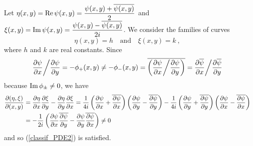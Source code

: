 Let $\displaystyle
\eta(x,y) = \operatorname{Re} \psi(x,y) = \frac{ \psi(x,y)+ \overline{\psi(x,y)}}{2}$
and
$\displaystyle \xi(x,y) = \operatorname{Im} \psi(x,y)
= \frac{ \psi(x,y) -\overline{\psi(x,y)}}{2i}$.
We consider the families of curves
\[
\eta(x,y) = h \quad \text{and} \quad \xi(x,y) = k \ ,
\]
where $h$ and $k$ are real constants.  Since
\[
\frac{\partial{\psi}}{\partial x} \bigg/ \frac{\partial{\psi}}{\partial y} = -\phi_{+}(x,y) \neq -\phi_{-}(x,y)
= \overline{ \left(\frac{\partial{\psi}}{\partial x} \bigg/ \frac{\partial{\psi}}{\partial y}\right)}
= \frac{\partial{\overline{\psi}}}{\partial x} \bigg/ \frac{\partial{\overline{\psi}}}{\partial y}
\]
because $\operatorname{Im} \phi_{\pm} \neq 0$, we have
\begin{align*}
\frac{\partial(\eta,\xi)}{\partial(x,y)}
&= \frac{\partial{\eta}}{\partial x}\frac{\partial{\xi}}{\partial y} - \frac{\partial{\eta}}{\partial y}\frac{\partial{\xi}}{\partial x}
=\frac{1}{4i}\left(\frac{\partial{\psi}}{\partial x}+ \overline{\frac{\partial{\psi}}{\partial x}}\right)
\left(\frac{\partial{\psi}}{\partial y} - \overline{\frac{\partial{\psi}}{\partial y}}\right)
- \frac{1}{4i}\left(\frac{\partial{\psi}}{\partial y}+ \overline{\frac{\partial{\psi}}{\partial y}}\right)
\left(\frac{\partial{\psi}}{\partial x} - \overline{\frac{\partial{\psi}}{\partial x}}\right) \\
&= - \frac{1}{2i} \left( \frac{\partial{\psi}}{\partial x}\overline{\frac{\partial{\psi}}{\partial y}}
- \frac{\partial{\psi}}{\partial y}\overline{\frac{\partial{\psi}}{\partial x}}\right)
\neq 0
\end{align*}
and so (\ref{classif_PDE2}) is satisfied.

